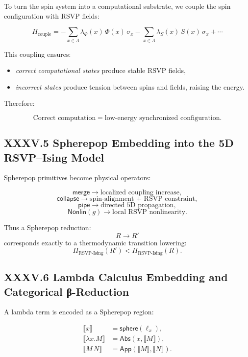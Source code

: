 \documentclass[11pt,letterpaper]{article}
\begin{document}
To turn the spin system into a computational substrate, we couple 
the spin configuration with RSVP fields:

\[
H_{\text{couple}}
=
- \sum_{x \in \Lambda}
\lambda_\Phi(x)\, \Phi(x)\, \sigma_x
- \sum_{x \in \Lambda} \lambda_S(x)\, S(x)\, \sigma_x
+ \cdots
\]

This coupling ensures:

\begin{itemize}
    \item \emph{correct computational states} produce stable RSVP fields,
    \item \emph{incorrect states} produce tension between spins and fields,
          raising the energy.
\end{itemize}

Therefore:

\[
\boxed{
\text{Correct computation} 
= \text{low-energy synchronized configuration}.
}
\]

\subsection{XXXV.5 Spherepop Embedding into the 5D RSVP--Ising Model}

Spherepop primitives become physical operators:

\[
\mathsf{merge} \longrightarrow \text{localized coupling increase},
\]
\[
\mathsf{collapse} \longrightarrow \text{spin-alignment + RSVP constraint},
\]
\[
\mathsf{pipe} \longrightarrow \text{directed 5D propagation},
\]
\[
\mathsf{Nonlin}(g) \longrightarrow \text{local RSVP nonlinearity}.
\]

Thus a Spherepop reduction:
\[
R \to R'
\]
corresponds exactly to a thermodynamic transition lowering:
\[
H_{\text{RSVP-Ising}}(R') < H_{\text{RSVP-Ising}}(R).
\]

\subsection{XXXV.6 Lambda Calculus Embedding and Categorical β-Reduction}

A lambda term is encoded as a Spherepop region:

\[
\begin{aligned}
\llbracket x \rrbracket &= \mathsf{sphere}(\ell_x),\\
\llbracket \lambda x.M \rrbracket &= \mathsf{Abs}(x, \llbracket M \rrbracket),\\
\llbracket M\,N \rrbracket &= \mathsf{App}(\llbracket M \rrbracket, \llbracket N \rrbracket).
\end{aligned}
\]
\end{document}
